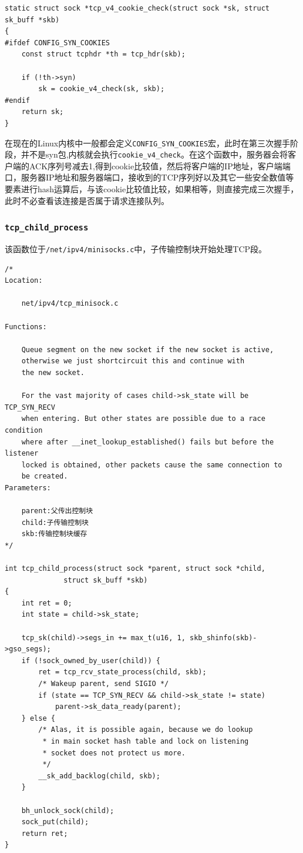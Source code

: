\begin{verbatim}
static struct sock *tcp_v4_cookie_check(struct sock *sk, struct sk_buff *skb)
{
#ifdef CONFIG_SYN_COOKIES
    const struct tcphdr *th = tcp_hdr(skb);

    if (!th->syn)
        sk = cookie_v4_check(sk, skb);
#endif
    return sk;
}
\end{verbatim}

                    在现在的Linux内核中一般都会定义\texttt{CONFIG_SYN_COOKIES}宏，此时在第三次握手阶段，并不是syn包,内核就会执行\texttt{cookie_v4_check}。在这个函数中，服务器会将客户端的ACK序列号减去1,得到cookie比较值，然后将客户端的IP地址，客户端端口，服务器IP地址和服务器端口，接收到的TCP序列好以及其它一些安全数值等要素进行hash运算后，与该cookie比较值比较，如果相等，则直接完成三次握手，此时不必查看该连接是否属于请求连接队列。

                \subsubsection{\texttt{tcp_child_process}}

                    该函数位于\texttt{/net/ipv4/minisocks.c}中，子传输控制块开始处理TCP段。

\begin{verbatim}
/*
Location:

	net/ipv4/tcp_minisock.c

Functions:

    Queue segment on the new socket if the new socket is active,
    otherwise we just shortcircuit this and continue with
    the new socket.

    For the vast majority of cases child->sk_state will be TCP_SYN_RECV
    when entering. But other states are possible due to a race condition
    where after __inet_lookup_established() fails but before the listener
    locked is obtained, other packets cause the same connection to
    be created.
Parameters:

	parent:父传出控制块
	child:子传输控制块
	skb:传输控制块缓存
*/

int tcp_child_process(struct sock *parent, struct sock *child,
              struct sk_buff *skb)
{
    int ret = 0;
    int state = child->sk_state;

    tcp_sk(child)->segs_in += max_t(u16, 1, skb_shinfo(skb)->gso_segs);
    if (!sock_owned_by_user(child)) {
        ret = tcp_rcv_state_process(child, skb);
        /* Wakeup parent, send SIGIO */
        if (state == TCP_SYN_RECV && child->sk_state != state)
            parent->sk_data_ready(parent);
    } else {
        /* Alas, it is possible again, because we do lookup
         * in main socket hash table and lock on listening
         * socket does not protect us more.
         */
        __sk_add_backlog(child, skb);
    }

    bh_unlock_sock(child);
    sock_put(child);
    return ret;
}
\end{verbatim}

